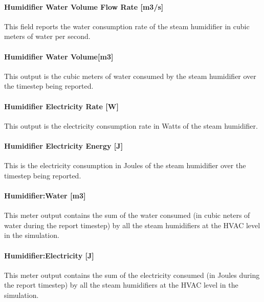 \paragraph{Humidifier Water Volume Flow Rate {[}m3/s{]}}\label{humidifier-water-volume-flow-rate-m3s}

This field reports the water consumption rate of the steam humidifier in cubic meters of water per second.

\paragraph{Humidifier Water Volume{[}m3{]}}\label{humidifier-water-volumem3}

This output is the cubic meters of water consumed by the steam humidifier over the timestep being reported.

\paragraph{Humidifier Electricity Rate {[}W{]}}\label{humidifier-electric-powerw}

This output is the electricity consumption rate in Watts of the steam humidifier.

\paragraph{Humidifier Electricity Energy {[}J{]}}\label{humidifier-electric-energy-j}

This is the electricity consumption in Joules of the steam humidifier over the timestep being reported.

\paragraph{Humidifier:Water {[}m3{]}}\label{humidifierwater-m3}

This meter output contains the sum of the water consumed (in cubic neters of water during the report timestep) by all the steam humidifiers at the HVAC level in the simulation.

\paragraph{Humidifier:Electricity {[}J{]}}\label{humidifierelectricity-j}

This meter output contains the sum of the electricity consumed (in Joules during the report timestep) by all the steam humidifiers at the HVAC level in the simulation.

